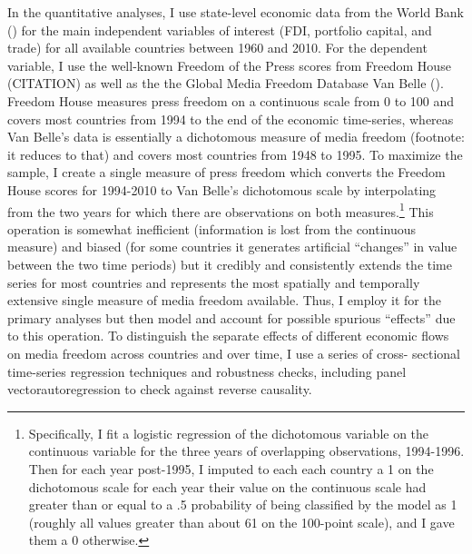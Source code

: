 \documentclass[12pt]{report}
\begin{document}
In the quantitative analyses, I use state-level economic data from the World Bank
(\citeyear{WorldDevelopmentIn:2012wl}) for the main independent variables of interest (FDI,
portfolio capital, and trade) for all available countries between 1960 and 2010. For the dependent
variable, I use the well-known Freedom of the Press scores from Freedom House (CITATION) as well as
the the Global Media Freedom Database Van Belle (\citeyear{Belle:1997wo,van2000press}). Freedom
House measures press freedom on a continuous scale from 0 to 100 and covers most countries from 1994
to the end of the economic time-series, whereas Van Belle's data is essentially a dichotomous
measure of media freedom (footnote: it reduces to that) and covers most countries from 1948 to 1995.
To maximize the sample, I create a single measure of press freedom which converts the Freedom House
scores for 1994-2010 to Van Belle's dichotomous scale by interpolating from the two years for which
there are observations on both measures.\footnote{Specifically, I fit a logistic regression of the
dichotomous variable on the continuous variable for the three years of overlapping observations,
1994-1996. Then for each year post-1995, I imputed to each each country a 1 on the dichotomous scale
for each year their value on the continuous scale had greater than or equal to a .5 probability of
being classified by the model as 1 (roughly all values greater than about 61 on the 100-point
scale), and I gave them a 0 otherwise.} This operation is somewhat inefficient (information is
lost from the continuous measure) and biased (for some countries it generates artificial ``changes''
in value between the two time periods) but it credibly and consistently extends the time series for
most countries and represents the most spatially and temporally extensive single measure of media
freedom available. Thus, I employ it for the primary analyses but then model and account for
possible spurious ``effects'' due to this operation. To distinguish the separate effects of
different economic flows on media freedom across countries and over time, I use a series of cross-
sectional time-series regression techniques and robustness checks, including panel
vectorautoregression to check against reverse causality.
\end{document}

